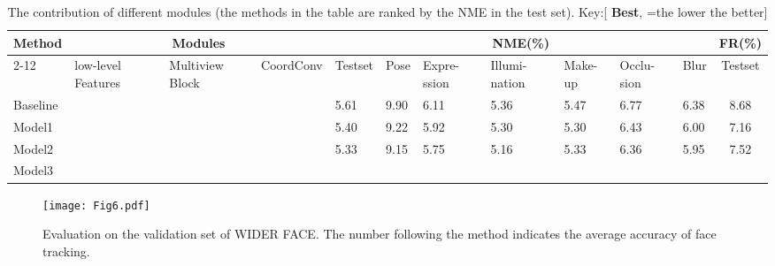 \documentclass[3p,twocolumn, round, sort & compress]{elsarticle}
\begin{document}
\begin{table*}[t!]
	\centering
	\begin{tabular}{m{1.05cm}<{\centering}|m{1.4cm}<{\centering}m{1.1cm}<{\centering}m{1.4cm}<{\centering}|m{0.6cm}<{\centering}m{0.6cm}<{\centering}m{0.6cm}<{\centering}m{0.6cm}<{\centering}m{0.6cm}<{\centering}m{0.6cm}<{\centering}m{0.6cm}<{\centering}|c}
		\hline
		\multirow{3}{*}{Method} & \multicolumn{3}{c|}{Modules} & \multicolumn{7}{c|}{NME(\%)} & FR(\%) \\ \cline{2-12} 
		& low-level Features & Multiview Block & CoordConv & Testset & Pose & Expre-ssion & Illumi-nation & Make-up & Occlu-sion & Blur & Testset \\ \hline
		Baseline & & &  & 5.61    & 9.90 & 6.11       & 5.36         & 5.47    & 6.77      & 6.38 & 8.68       \\
		Model1                  &    \checkmark          &                 &           & 5.40    & 9.22 & 5.92       & 5.30         & 5.30    & 6.43      & 6.00 & 7.16       \\
		Model2                  &     \checkmark        &   \checkmark      &           & 5.33    & 9.15 & 5.75       & 5.16         & 5.33    & 6.36      & 5.95 & 7.52       \\
		Model3                  &    \checkmark      &   \checkmark  & \checkmark  & {\color{red} \textbf{}}    & {\color{red} \textbf{}} & {\color{red} \textbf{}} & {\color{red} \textbf{}} & {\color{red} \textbf{}}    & {\color{red} \textbf{}} & {\color{red} \textbf{}} & {\color{red} \textbf{}}    \\ \hline
	\end{tabular}
	\caption{The contribution of different modules (the methods in the table are ranked by the NME in the test set). Key:[{\color{red} \textbf{Best}}, =the lower the better]}
	\label{Tabal7}
\end{table*}


\begin{figure}[t!]
	\centering
	\texttt{[image: Fig6.pdf]}
	\caption{Evaluation on the validation set of WIDER FACE. The number following the method indicates the average accuracy of face tracking.}
	\label{fig6}
\end{figure}
\end{document}

